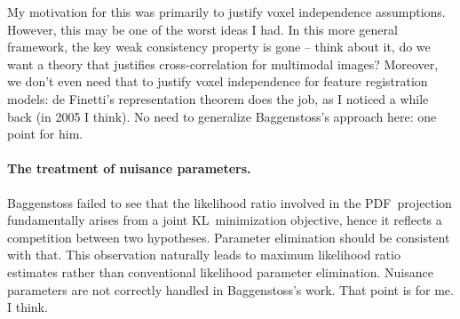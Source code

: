 \documentclass[english]{scrartcl}
\begin{document}
My motivation for this was primarily to justify voxel independence assumptions. However, this may be one of the worst ideas I had. In this more general framework, the key weak consistency property is gone -- think about it, do we want a theory that justifies cross-correlation for multimodal images? Moreover, we don't even need that to justify voxel independence for feature registration models: de Finetti's representation theorem does the job, as I noticed a while back (in 2005 I think). No need to generalize Baggenstoss's approach here: one point for him.

\paragraph{The treatment of nuisance parameters.} Baggenstoss failed to see that the likelihood ratio involved in the PDF~projection fundamentally arises from a joint KL~minimization objective, hence it reflects a competition between two hypotheses. Parameter elimination should be consistent with that. This observation naturally leads to maximum likelihood ratio estimates rather than conventional likelihood parameter elimination. Nuisance parameters are not correctly handled in Baggenstoss's work. That point is for me. I think.










\end{document}
